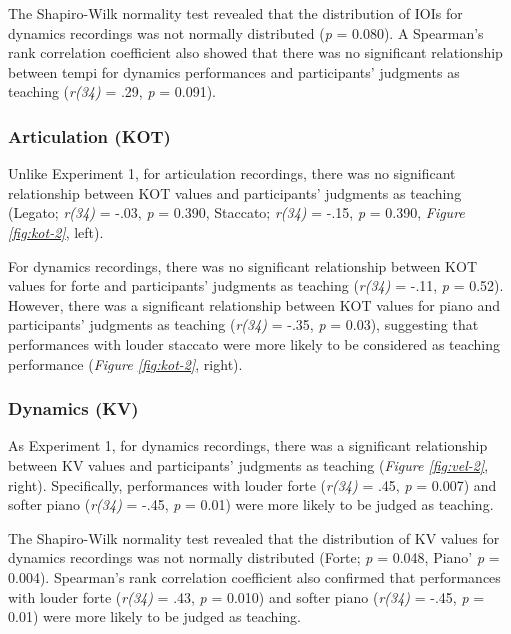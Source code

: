 \documentclass[
  man,floatsintext]{apa6}
\begin{document}
The Shapiro-Wilk normality test revealed that the distribution of IOIs for dynamics recordings was not normally distributed (\emph{p} = 0.080). A Spearman's rank correlation coefficient also showed that there was no significant relationship between tempi for dynamics performances and participants' judgments as teaching (\emph{r(34)} = .29, \emph{p} = 0.091).

\hypertarget{articulation-kot-1}{%
\subsubsection{Articulation (KOT)}\label{articulation-kot-1}}

Unlike Experiment 1, for articulation recordings, there was no significant relationship between KOT values and participants' judgments as teaching (Legato; \emph{r(34)} = -.03, \emph{p} = 0.390, Staccato; \emph{r(34)} = -.15, \emph{p} = 0.390, \emph{Figure \ref{fig:kot-2}}, left).

For dynamics recordings, there was no significant relationship between KOT values for forte and participants' judgments as teaching (\emph{r(34)} = -.11, \emph{p} = 0.52). However, there was a significant relationship between KOT values for piano and participants' judgments as teaching (\emph{r(34)} = -.35, \emph{p} = 0.03), suggesting that performances with louder staccato were more likely to be considered as teaching performance (\emph{Figure \ref{fig:kot-2}}, right).

\hypertarget{dynamics-kv-1}{%
\subsubsection{Dynamics (KV)}\label{dynamics-kv-1}}

As Experiment 1, for dynamics recordings, there was a significant relationship between KV values and participants' judgments as teaching (\emph{Figure \ref{fig:vel-2}}, right). Specifically, performances with louder forte (\emph{r(34)} = .45, \emph{p} = 0.007) and softer piano (\emph{r(34)} = -.45, \emph{p} = 0.01) were more likely to be judged as teaching.

The Shapiro-Wilk normality test revealed that the distribution of KV values for dynamics recordings was not normally distributed (Forte; \emph{p} = 0.048, Piano' \emph{p} = 0.004). Spearman's rank correlation coefficient also confirmed that performances with louder forte (\emph{r(34)} = .43, \emph{p} = 0.010) and softer piano (\emph{r(34)} = -.45, \emph{p} = 0.01) were more likely to be judged as teaching.
\end{document}
